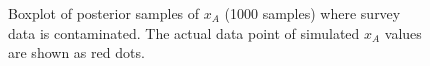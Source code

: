 \documentclass[]{article}
\begin{document}
\begin{figure}[h]
	\centering
	\caption[two early result box plots:xa]{Boxplot of posterior samples of $x_A$ (1000 samples) where survey data is contaminated.  The actual data point of simulated $x_A$ values are shown as red dots.}
	\label{contam_xt}
\end{figure}
 


\end{document}
